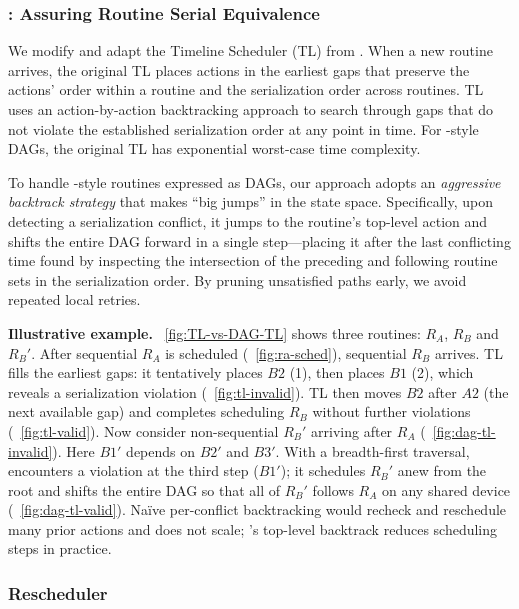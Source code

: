 \subsubsection{\scheduler: Assuring Routine Serial Equivalence}
\label{sec:scheduler}

We modify and adapt the Timeline Scheduler  (TL) from \cite{SafeHomeEuroSys2021}. 
When a new routine arrives, the original TL places actions in the earliest gaps that preserve the actions' order within a routine and the serialization order across routines.
TL uses an action-by-action backtracking approach to search through gaps that do not violate the established serialization order at any point in time. For \sysname-style DAGs, the original TL has exponential worst-case time complexity. 

{
To handle \sysname-style routines expressed as DAGs, our {\it \scheduler} approach 
adopts an {\it aggressive backtrack strategy} that makes ``big jumps'' in the state space.}
{Specifically, upon detecting a serialization conflict, it jumps to the routine’s top-level action and shifts the entire DAG forward in a single step---placing it after the last conflicting time found by inspecting the intersection of the preceding and following routine sets in the serialization order. By pruning unsatisfied paths early, we avoid repeated local retries.}

\noindent\textbf{Illustrative example.}
\Figure~\ref{fig:TL-vs-DAG-TL} shows three routines: $R_A$, $R_B$ and $R_B'$. After sequential $R_A$ is scheduled (\Figure~\ref{fig:ra-sched}), sequential $R_B$ arrives.
TL fills the earliest gaps: it tentatively places $B2$ (1), then places $B1$ (2), which reveals a serialization violation (\Figure~\ref{fig:tl-invalid}).
TL then moves $B2$ after $A2$ (the next available gap) and completes scheduling $R_B$ without further violations (\Figure~\ref{fig:tl-valid}).
Now consider non-sequential $R_B'$ arriving after $R_A$ (\Figure~\ref{fig:dag-tl-invalid}). 
Here $B1'$ depends on $B2'$ and $B3'$.
With a breadth-first traversal, \scheduler{} encounters a violation at the third step ($B1'$); it schedules $R_B'$ anew from the root and shifts the entire DAG so that all of $R_B'$ follows $R_A$ on any shared device (\Figure~\ref{fig:dag-tl-valid}). 
Naïve per-conflict backtracking would recheck and reschedule many prior actions and does not scale; \scheduler’s top-level backtrack reduces scheduling steps in practice.


\subsubsection{Rescheduler}
\label{sec:rescheduler}


